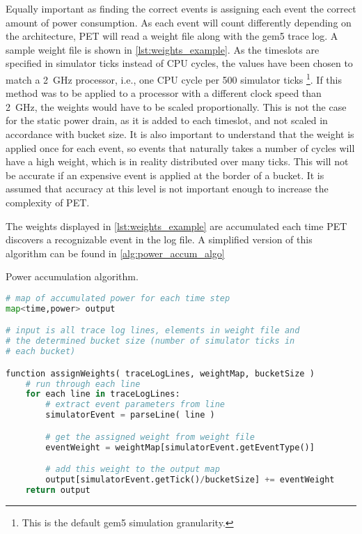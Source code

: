 Equally important as finding the correct events is assigning each event the
correct amount of power consumption. As each event will count differently
depending on the architecture, PET will read a weight file along with the gem5
trace log. A sample weight file is shown in \autoref{lst:weights_example}. As
the timeslots are specified in simulator ticks instead of CPU cycles, the values
have been chosen to match a 2~GHz processor, i.e., one CPU cycle per 500
simulator ticks \footnote{This is the default gem5 simulation granularity.}. If
this method was to be applied to a processor with a different clock speed than
2~GHz, the weights would have to be scaled proportionally. This is not the case
for the static power drain, as it is added to each timeslot, and not scaled in
accordance with bucket size. It is also important to understand that the weight
is applied once for each event, so events that naturally takes a number of
cycles will have a high weight, which is in reality distributed over many ticks.
This will not be accurate if an expensive event is applied at the border of a
bucket. It is assumed that accuracy at this level is not important enough to
increase the complexity of PET.



The weights displayed in \autoref{lst:weights_example} are accumulated each time
PET discovers a recognizable event in the log file. A simplified version of this
algorithm can be found in
\autoref{alg:power_accum_algo}

\begin{algorithm}
\caption{Power accumulation algorithm.}
\label{alg:power_accum_algo}
\begin{lstlisting}[language=Python,style=algo]
# map of accumulated power for each time step
map<time,power> output

# input is all trace log lines, elements in weight file and
# the determined bucket size (number of simulator ticks in
# each bucket)

function assignWeights( traceLogLines, weightMap, bucketSize )
    # run through each line
    for each line in traceLogLines:
        # extract event parameters from line
        simulatorEvent = parseLine( line )

        # get the assigned weight from weight file
        eventWeight = weightMap[simulatorEvent.getEventType()]

        # add this weight to the output map
        output[simulatorEvent.getTick()/bucketSize] += eventWeight
    return output
\end{lstlisting}
\end{algorithm}

